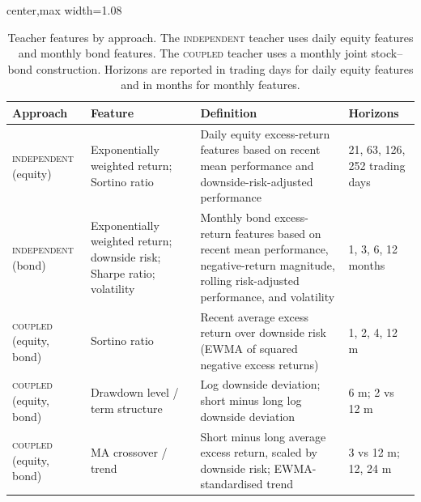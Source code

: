 \documentclass[10pt]{article}
\newcommand{\Acoup}{\textsc{coupled}}
\newcommand{\Bindep}{\textsc{independent}}
\begin{document}
\begin{table}[H]
    \centering
    \caption{Teacher features by approach. The \Bindep{} teacher uses daily equity features and monthly bond features. The \Acoup{} teacher uses a monthly joint stock--bond construction. Horizons are reported in trading days for daily equity features and in months for monthly features.}
    \label{tab:teacher-features}
    \small
    \begin{adjustbox}{center,max width=1.08\textwidth}
        \begin{tabular}{p{2.1cm}p{2.3cm}p{6.4cm}p{3.0cm}}
            \toprule
            Approach                & Feature                                                                & Definition                                                                                                                                         & Horizons                      \\
            \midrule
            \Bindep{} (equity)      & Exponentially weighted return; Sortino ratio                           & Daily equity excess-return features based on recent mean performance and downside-risk-adjusted performance                                        & 21, 63, 126, 252 trading days \\
            \Bindep{} (bond)        & Exponentially weighted return; downside risk; Sharpe ratio; volatility & Monthly bond excess-return features based on recent mean performance, negative-return magnitude, rolling risk-adjusted performance, and volatility & 1, 3, 6, 12 months            \\
            \midrule
            \Acoup{} (equity, bond) & Sortino ratio                                                          & Recent average excess return over downside risk (EWMA of squared negative excess returns)                                                          & 1, 2, 4, 12 m                 \\
            \Acoup{} (equity, bond) & Drawdown level / term structure                                        & Log downside deviation; short minus long log downside deviation                                                                                    & 6 m; 2 vs 12 m                \\
            \Acoup{} (equity, bond) & MA crossover / trend                                                   & Short minus long average excess return, scaled by downside risk; EWMA-standardised trend                                                           & 3 vs 12 m; 12, 24 m           \\
            \bottomrule
        \end{tabular}
    \end{adjustbox}
\end{table}
\end{document}
